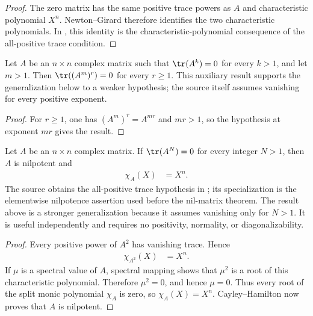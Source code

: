 \begin{proof}\leanok
    The zero matrix has the same positive trace powers as $A$ and characteristic
    polynomial $X^n$. Newton--Girard therefore identifies the two characteristic
    polynomials. In \cite[proof of Proposition~III.3]{Cirac2017MPU}, this identity is the characteristic-polynomial consequence of the
    all-positive trace
    condition.
\end{proof}

\begin{lemma}
    \label{thm:mpu_shifted_zero_trace_power_moments}
    \leanok
    Let $A$ be an $n\times n$ complex matrix such that $\tr(A^k)=0$ for every
    $k>1$, and let $m>1$. Then $\tr((A^m)^r)=0$ for every $r\geq1$.
    This auxiliary result supports the generalization below to a weaker
    hypothesis; the source itself assumes vanishing for every positive exponent.
\end{lemma}

\begin{proof}\leanok
    For $r\geq1$, one has $(A^m)^r=A^{mr}$ and $mr>1$, so the hypothesis at
    exponent $mr$ gives the result.
\end{proof}

\begin{lemma}
    \label{thm:mpu_shifted_zero_trace_power_nilpotent}
    \leanok
    Let $A$ be an $n\times n$ complex matrix. If $\tr(A^N)=0$ for every integer
    $N>1$, then $A$ is nilpotent and
    \begin{align}
        \chi_A(X) & =X^n.
    \end{align}
    The source obtains the all-positive trace hypothesis in
    \cite[proof of Proposition~III.3]{Cirac2017MPU}; its specialization is
    the elementwise nilpotence assertion used before the nil-matrix theorem. The
    result above is a stronger generalization because it assumes vanishing only
    for $N>1$. It is useful independently and requires no positivity, normality,
    or diagonalizability.
\end{lemma}

\begin{proof}\leanok
    Every positive power of $A^2$ has vanishing trace. Hence
    \begin{align}
        \chi_{A^2}(X) & =X^n.
    \end{align}
    If $\mu$ is a spectral value of $A$, spectral mapping shows that $\mu^2$ is
    a root of this characteristic polynomial. Therefore $\mu^2=0$, and hence
    $\mu=0$. Thus every root of the split
    monic polynomial $\chi_A$ is zero, so $\chi_A(X)=X^n$.
    Cayley--Hamilton now proves that $A$ is nilpotent.
\end{proof}


